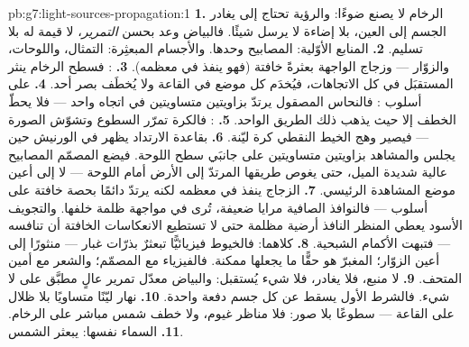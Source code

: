 \begin{solution}{pb:g7:light-sources-propagation:1}
\textbf{1.} الرخام لا يصنع ضوءًا: والرؤية تحتاج إلى  يغادر
الجسم إلى العين،  بلا إضاءة لا يرسل شيئًا.
فالبياض وعد بحسن \emph{التمرير}، لا قيمة له بلا تسليم.
\textbf{2.} المنابع الأوّلية: المصابيح وحدها. والأجسام
المبعثِرة: التمثال، واللوحات، والزوّار --- وزجاج الواجهة
بعثرةً خافتة (فهو ينفذ في معظمه).
\textbf{3.} : فسطح الرخام ينثر  المستقبَل في كل
الاتجاهات، فيُخدَم كل موضع في القاعة ولا يُخطَف بصر أحد.
\textbf{4.}  على أسلوب : فالنحاس المصقول يرتدّ
  بزاويتين متساويتين في اتجاه واحد --- فلا يحطّ
الخطف إلا حيث يذهب ذلك الطريق الواحد.
\textbf{5.} : فالكرة تمرّر السطوع وتشوّش الصورة ---
فيصير وهج الخيط النقطي كرة  ليّنة.
\textbf{6.} بقاعدة الارتداد يظهر  في الورنيش حين يجلس
 والمشاهد بزاويتين متساويتين على جانبَي سطح اللوحة.
فيضع المصمّم المصابيح عالية شديدة الميل، حتى يغوص طريقها
المرتدّ إلى الأرض أمام اللوحة --- لا إلى أعين موضع المشاهدة
الرئيسي.
\textbf{7.} الزجاج ينفذ في معظمه لكنه يرتدّ دائمًا بحصة خافتة
على أسلوب  --- فالنوافذ الصافية مرايا ضعيفة، تُرى في
مواجهة ظلمة خلفها. والتجويف الأسود يعطي المنظر النافذ أرضية
مظلمة حتى لا تستطيع الانعكاسات الخافتة أن تنافسه --- فتبهت
الأكمام الشبحية.
\textbf{8.} كلاهما: فالخيوط فيزيائيًّا تبعثرٌ بذرّات غبار ---
  منثورًا إلى أعين الزوّار؛  المغبرّ هو حقًّا
ما يجعلها ممكنة. فالفيزياء مع المصمّم؛ والشعر مع أمين
المتحف.
\textbf{9.} لا منبع، فلا  يغادر، فلا شيء يُستقبل: والبياض
معدّل تمرير عالٍ مطبَّق على لا شيء. فالشرط الأول يسقط عن كل
جسم دفعة واحدة.
\textbf{10.}  نهار ليّنًا متساويًا بلا ظلال على القاعة ---
سطوعًا بلا صور: فلا مناظر غيوم، ولا خطف شمس مباشر على
الرخام.
\textbf{11.} السماء نفسها:  يبعثر  الشمس. 

\end{solution}
